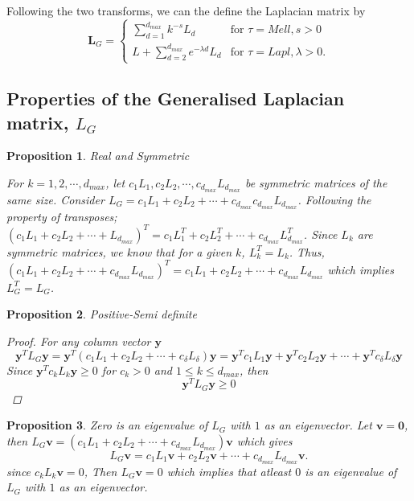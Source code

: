\documentclass[12pt]{article}
\newtheorem{prop}{Proposition}
\begin{document}
Following the two transforms, we can the define the Laplacian matrix by \cite{estrada2017sync}
\begin{equation}
\mathbf{L}_{G} = \begin{cases} \sum_{d=1}^{d_{max}} k^{-s} L_d &\mbox{for } \tau = Mell, s>0 \\
L + \sum_{d=2}^{d_{max}} e^{-\lambda d} L_d   & \mbox{for } \tau = Lapl, \lambda>0. \end{cases} 
\end{equation}

\subsection{Properties of the Generalised Laplacian matrix, $L_G$}
\begin{prop}
	Real and Symmetric
	
	For $k=1,2,\cdots, d_{max}$, let $c_1 L_1,c_2 L_2, \cdots, c_{d_{max}} L_{d_{max}}$ be symmetric matrices of the same size. Consider $ L_G = c_1L_1+ c_2 L_2 + \cdots+ c_{d_{max}} c_{d_{max}} L_{d_{max}}$. Following the property of transposes; $ (c_1L_1+ c_2 L_2 + \cdots+ L_{d_{max}})^T =  c_1 L_1^T + c_2 L_2^T + \cdots+ c_{d_{max}} L_{d_{max}}^T$. Since $L_k$ are symmetric matrices, we know that for a given $k$, $L_{k} ^T = L_k$. Thus, $(c_1 L_1+ c_2 L_2 + \cdots+ c_{d_{max}} L_{d_{max}})^T = c_1 L_1+ c_2 L_2 + \cdots+ c_{d_{max}} L_{d_{max}}$ which implies $L_{G}^T = L_G$.
\end{prop}
\begin{prop}
	Positive-Semi definite
	\begin{proof}
		For any column vector $\mathbf{y}$
		\begin{equation}
		\mathbf{y}^T L_{G} \mathbf{y} = \mathbf{y}^T(c_{1}L_{1} + c_{2}L_{2} + \cdots + c_{\delta}L_{\delta} )\mathbf{y}
		= \mathbf{y}^Tc_{1}L_{1}\mathbf{y} + \mathbf{y}^Tc_{2}L_{2}\mathbf{y} + \cdots + \mathbf{y}^Tc_{\delta}L_{\delta}\mathbf{y} 
		\end{equation}
		Since $\mathbf{y}^Tc_{k}L_{k}\mathbf{y} \geq 0$ for $c_{k}>0$ and $1 \leq k \leq d_{max}$, then
		\begin{equation}
		\mathbf{y}^T L_{G} \mathbf{y} \geq 0	
		\end{equation}
	\end{proof}
\end{prop}
\begin{prop}
	Zero is an eigenvalue of $L_G$ with $1$ as an eigenvector.
	Let $\mathbf{v} = \mathbf{0}$, then $ L_G \mathbf{v} = (c_1L_1+ c_2 L_2 + \cdots+ c_{d_{max}} L_{d_{max}}) \mathbf{v}$ which gives
	\begin{equation}
	L_G \mathbf{v} = c_1 L_1 \mathbf{v} + c_2 L_2 \mathbf{v} + \cdots+ c_{d_{max}} L_{d_{max}} \mathbf{v}.
	\end{equation}
	since $c_k L_k \mathbf{v} =0$, Then $L_G \mathbf{v} = 0$ which implies that atleast $0$ is an eigenvalue of $L_G$ with $1$ as an eigenvector.
\end{prop}
\end{document}

